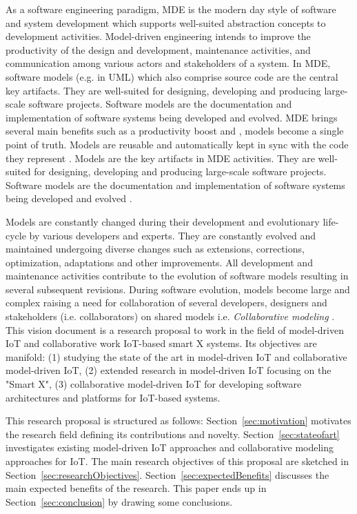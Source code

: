 As a software engineering paradigm, MDE is the modern day style of software and system development which supports well-suited abstraction concepts to development activities. Model-driven engineering intends to improve the productivity of the design and development, maintenance activities, and communication among various actors and stakeholders of a system. In MDE, software models (e.g. in UML) which also comprise source code are the central key artifacts. They are well-suited for designing, developing and producing large-scale software projects. Software models are the documentation and implementation of software systems being developed and evolved. MDE brings several main benefits such as a productivity boost and , models become a single point of truth. Models are reusable and automatically kept in sync with the code they represent \cite{Fleurey+2011}. Models are the key artifacts in MDE activities. They are well-suited for designing, developing and producing large-scale software projects. Software models are the documentation and implementation of software systems being developed and evolved \cite{Kleppe+2003}.

Models are constantly changed during their development and evolutionary life-cycle by various developers and experts. They are constantly evolved and maintained undergoing diverse changes such as extensions, corrections, optimization, adaptations and other improvements. All development and maintenance activities contribute to the evolution of software models resulting in several subsequent revisions. During software evolution, models become large and complex raising a need for collaboration of several developers, designers and stakeholders (i.e. collaborators) on shared models i.e. \textit{Collaborative modeling} \cite{Kuryazov+2018}. This vision document is a research proposal to work in the field of model-driven IoT and collaborative work IoT-based smart X systems. Its objectives are manifold: (1) studying the state of the art in model-driven IoT and collaborative model-driven IoT, (2) extended research in model-driven IoT focusing on the "Smart X", (3) collaborative model-driven IoT for developing software architectures and platforms for IoT-based systems.

This research proposal is structured as follows: Section~\ref{sec:motivation} motivates the research field defining its contributions and novelty. Section~\ref{sec:stateofart} investigates existing model-driven IoT approaches and collaborative modeling approaches for IoT. The main research objectives of this proposal are sketched in Section~\ref{sec:researchObjectives}. Section~\ref{sec:expectedBenefits} discusses the main expected benefits of the research. This paper ends up in Section~\ref{sec:conclusion} by drawing some conclusions.